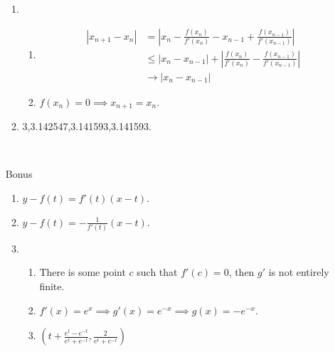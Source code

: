 \documentclass[12pt]{article}
\begin{document}
\begin{enumerate}
\begin{enumerate}
            \item \begin{enumerate}
                \item \begin{align*}
                    |x_{n+1}-x_n|&=|x_n-\frac{f(x_n)}{f'(x_n)}-x_{n-1}+\frac{f(x_{n-1})}{f'(x_{n-1})}|\\
                    &\leq |x_n-x_{n-1}|+|\frac{f(x_n)}{f'(x_n)}-\frac{f(x_{n-1})}{f'(x_{n-1})}|\\
                    &\to |x_n-x_{n-1}|
                \end{align*}
                \item $f(x_n)=0\implies x_{n+1}=x_n$.
            \end{enumerate}
            \item 3,3.142547,3.141593,3.141593.
        \end{enumerate}\
        \item [Bonus]\begin{enumerate}
            \item $y-f(t)=f'(t)(x-t)$.
            \item $y-f(t)=-\frac{1}{f'(t)}(x-t)$.
            \item \begin{enumerate}
                \item There is some point $c$ such that $f'(c)=0$, then $g'$ is not entirely finite.
                \item $f'(x)=e^x\implies g'(x)=e^{-x}\implies g(x)=-e^{-x}$.
                \item $(t+\frac{e^t-e^{-t}}{e^t+e^{-t}},\frac{2}{e^t+e^{-t}})$
            \end{enumerate}
        \end{enumerate}
    \end{enumerate}
\end{document}
